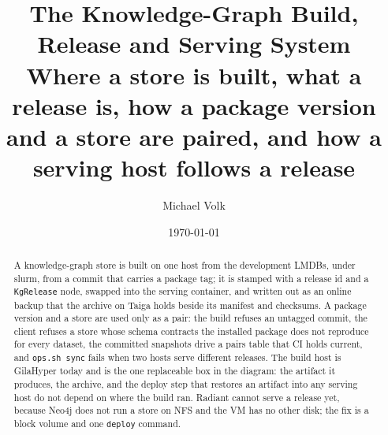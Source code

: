\documentclass[10pt,a4paper]{article}
\title{\vspace{-1.5em}The Knowledge-Graph Build, Release and Serving System\\
  {\large Where a store is built, what a release is, how a package version and a
   store are paired, and how a serving host follows a release}}
\author{Michael Volk}
\date{\today}
\begin{document}
\maketitle
\thispagestyle{empty}

\begin{abstract}
\noindent
A knowledge-graph store is built on one host from the development LMDBs, under
slurm, from a commit that carries a package tag; it is stamped with a release id
and a \texttt{KgRelease} node, swapped into the serving container, and written out
as an online backup that the archive on Taiga holds beside its manifest and
checksums. A package version and a store are used only as a pair: the build
refuses an untagged commit, the client refuses a store whose schema contracts the
installed package does not reproduce for every dataset, the committed snapshots
drive a pairs table that CI holds current, and \texttt{ops.sh sync} fails when two
hosts serve different releases. The build host is GilaHyper today and is the one
replaceable box in the diagram: the artifact it produces, the archive, and the
deploy step that restores an artifact into any serving host do not depend on
where the build ran. Radiant cannot serve a release yet, because Neo4j does not
run a store on NFS and the VM has no other disk; the fix is a block volume and
one \texttt{deploy} command.
\end{abstract}

\vspace{0.5em}
\tccontents
\clearpage






\end{document}
